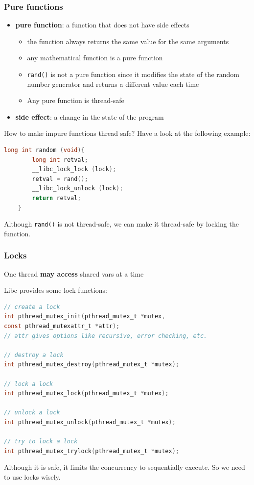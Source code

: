 \documentclass[letterpaper,12pt]{article}
\begin{document}
\subsubsection{Pure functions}
\begin{itemize}
    \item \textbf{pure function}: a function that does not have side effects\begin{itemize}
        \item the function always returns the same value for the same arguments
        \item any mathematical function is a pure function
        \item \texttt{rand()} is not a pure function since it modifies the state of the random number generator and returns a different value each time
        \item Any pure function is thread-safe
    \end{itemize}
    \item \textbf{side effect}: a change in the state of the program
\end{itemize}
How to make impure functions thread safe? Have a look at the following example:\begin{lstlisting}[language=C]
    long int random (void){
        long int retval;
        __libc_lock_lock (lock);
        retval = rand();
        __libc_lock_unlock (lock);
        return retval;
    }
\end{lstlisting}
Although \texttt{rand()} is not thread-safe, we can make it thread-safe by locking the function.
\subsubsection{Locks}
One thread \textbf{may access} shared vars at a time

Libc provides some lock functions:\begin{lstlisting}[language=C]
// create a lock
int pthread_mutex_init(pthread_mutex_t *mutex, 
const pthread_mutexattr_t *attr);
// attr gives options like recursive, error checking, etc.

// destroy a lock
int pthread_mutex_destroy(pthread_mutex_t *mutex);

// lock a lock
int pthread_mutex_lock(pthread_mutex_t *mutex);

// unlock a lock
int pthread_mutex_unlock(pthread_mutex_t *mutex);

// try to lock a lock
int pthread_mutex_trylock(pthread_mutex_t *mutex);
\end{lstlisting}
Although it is safe, it limits the concurrency to sequentially execute. So we need to use locks wisely.
\end{document}
